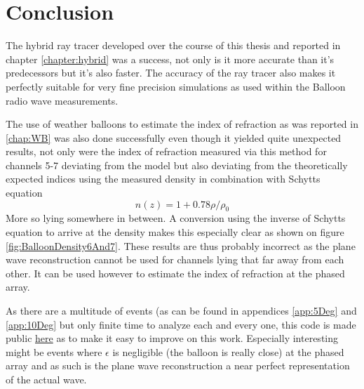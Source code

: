\chapter*{Conclusion}
The hybrid ray tracer developed over the course of this thesis and reported in
chapter \ref{chapter:hybrid} was a success, not only is it more accurate than
it's predecessors but it's also faster.  The accuracy of the ray tracer also
makes it perfectly suitable for very fine precision simulations as used within
the Balloon radio wave measurements.

The use of weather balloons to estimate the index of refraction as
was reported in \ref{chap:WB} was also done successfully even though
it yielded quite unexpected results, not only were the index of
refraction measured via this method for channels 5-7 deviating from the model but
also deviating from the theoretically expected indices using the
measured density in combination with Schytts equation
\begin{equation*}
	n(z) = 1+ 0.78\rho/\rho_0
\end{equation*}
More so lying somewhere in between. A conversion using the inverse of
Schytts equation to arrive at the density makes this especially
clear as shown on figure \ref{fig:BalloonDensity6And7}.
These results are thus probably incorrect as the plane wave
reconstruction cannot be used for channels lying that far 
away from each other. It can be used however to estimate
the index of refraction at the phased array.

As there are a multitude of events (as can be found in appendices
\ref{app:5Deg} and \ref{app:10Deg} but only finite time to analyze
each and every one, this code is made public
\href{https://github.com/arthuradriaens-code/projects-mt.git}{here}
as to make it easy to improve on this work.  Especially interesting
might be events where $\epsilon$ is negligible (the balloon is
really close) at the phased array and as such is the plane wave
reconstruction a near perfect representation of the actual wave.

